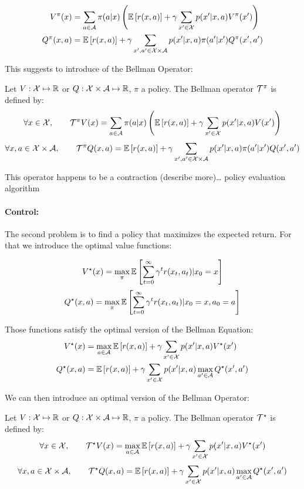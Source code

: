 \begin{align}
V^\pi(x) &= \sum_{a \in \mathcal{A}} \pi(a|x) \left( \mathbb{E}\left[ r(x,a) \right] + \gamma \sum_{x^\prime  \in \mathcal{X}} p(x^\prime |x,a)V^\pi(x^\prime ) \right) \\
Q^\pi(x,a) &= \mathbb{E}\left[ r(x,a) \right] + \gamma \sum_{x^\prime ,a^\prime  \in \mathcal{X} \times \mathcal{A}} p(x^\prime |x,a)\pi(a^\prime |x^\prime )Q^\pi(x^\prime ,a^\prime )
\end{align}

This suggests to introduce of the Bellman Operator:

\begin{definition}
Let $V: \mathcal{X} \mapsto \mathbb{R}$ or $Q: \mathcal{X} \times \mathcal{A} \mapsto \mathbb{R}$, $\pi$ a policy. The Bellman operator $\mathcal{T}^\pi$ is defined by:
\[ \forall x \in \mathcal{X}, \qquad \mathcal{T}^\pi V(x) = \sum_{a \in \mathcal{A}} \pi(a|x) \left( \mathbb{E}\left[ r(x,a) \right] + \gamma \sum_{x^\prime  \in \mathcal{X}} p(x^\prime |x,a)V(x^\prime ) \right) \]
\[ \forall x,a \in \mathcal{X} \times \mathcal{A}, \qquad \mathcal{T}^\pi Q(x,a) = \mathbb{E}\left[ r(x,a) \right] + \gamma \sum_{x^\prime ,a^\prime  \in \mathcal{X} \times \mathcal{A}} p(x^\prime |x,a)\pi(a^\prime |x^\prime )Q(x^\prime ,a^\prime ) \]
\end{definition}

This operator happens to be a contraction (describe more)… policy evaluation algorithm

\paragraph{Control:} The second problem is to find a policy that maximizes the expected return. For that we introduce the optimal value functions:

\[ V^{\star}(x) = \max_{\pi} \mathbb{E}\left[ \sum_{t=0}^\infty  \gamma^t r(x_t, a_t) | x_0 = x \right] \]
\[ Q^{\star}(x,a) = \max_{\pi} \mathbb{E}\left[ \sum_{t=0}^\infty  \gamma^t r(x_t, a_t) | x_0 = x, a_0 = a \right] \] 

Those functions satisfy the optimal version of the Bellman Equation:
\begin{align}
V^{\star}(x) & = \max_{a \in \mathcal{A}} \mathbb{E}\left[ r(x,a) \right] + \gamma \sum_{x^\prime  \in \mathcal{X}} p(x^\prime |x,a)V^{\star}(x^\prime ) \\
Q^{\star}(x,a) & = \mathbb{E}\left[ r(x,a) \right] + \gamma \sum_{x^\prime  \in \mathcal{X}} p(x^\prime |x,a)\max_{a^\prime  \in \mathcal{A}}Q^{\star}(x^\prime ,a^\prime )
\end{align}

We can then introduce an optimal version of the Bellman Operator:

\begin{definition}
Let $V: \mathcal{X} \mapsto \mathbb{R}$ or $Q: \mathcal{X} \times \mathcal{A} \mapsto \mathbb{R}$, $\pi$ a policy. The Bellman operator $\mathcal{T}^{\star}$ is defined by:
\[ \forall x \in \mathcal{X}, \qquad \mathcal{T}^{\star} V(x) = \max_{a \in \mathcal{A}} \mathbb{E}\left[ r(x,a) \right] + \gamma \sum_{x^\prime  \in \mathcal{X}} p(x^\prime |x,a)V^{\star}(x^\prime ) \]
\[ \forall x,a \in \mathcal{X} \times \mathcal{A}, \qquad \mathcal{T}^{\star} Q(x,a) = \mathbb{E}\left[ r(x,a) \right] + \gamma \sum_{x^\prime  \in \mathcal{X}} p(x^\prime |x,a)\max_{a^\prime  \in \mathcal{A}}Q^{\star}(x^\prime ,a^\prime ) \]
\end{definition}

